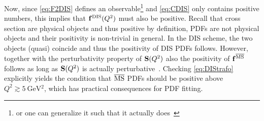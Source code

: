 Now, since \cref{eq:F2DIS} defines an observable\footnote{or one can generalize it such that it actually does~\cite{Candido:2023ujx}} and \cref{eq:CDIS} only contains positive numbers, this implies that $\vb f^{\mathrm{DIS}}(Q^2)$ must also be positive.
Recall that cross section are physical objects and thus positive by definition, PDFs are not physical objects and their positivity is non-trivial in general.
In the DIS scheme, the two objects (quasi) coincide and thus the positivity of DIS PDFs follows.
However, together with the perturbativity property of $\vb S(Q^2)$ also the positivity of $\vb f^{\overline{\mathrm{MS}}}$ follows as long as $\vb S(Q^2)$ is actually perturbative~\cite{Candido:2023ujx}.
Checking \cref{eq:DIStrafo} explicitly yields the condition that $\overline{\mathrm{MS}}$ PDFs should be positive above $Q^2 \gtrsim \SI{5}{\GeV^2}$, which has practical consequences for PDF fitting.
